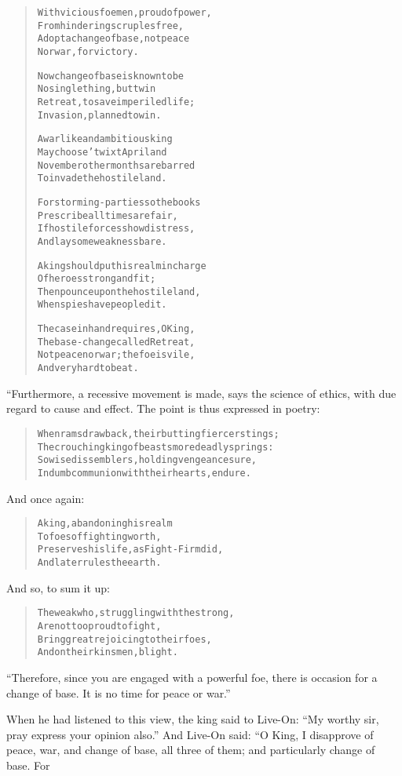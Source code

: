 \documentclass[article, twoside, 10pt]{memoir}
\renewenvironment{verbatim}{%
\begin{quote}%
\vskip -10pt%
\begin{alltt}\normalfont\small}{\end{alltt}%
\end{quote}%
\vskip -10pt
} %
\begin{document}
\begin{verbatim}
With vicious foemen, proud of power,
    From hindering scruples free,
Adopt a change of base, not peace
    Nor war, for victory.

Now change of base is known to be
    No single thing, but twin{\textemdash}
Retreat, to save imperiled life;
    Invasion, planned to win.

A warlike and ambitious king
    May choose 'twixt April and
November{\textemdash}other months are barred{\textemdash}
    To invade the hostile land.

For storming-parties{\textemdash}so the books
    Prescribe{\textemdash}all times are fair,
If hostile forces show distress,
    And lay some weakness bare.

A king should put his realm in charge
    Of heroes strong and fit;
Then pounce upon the hostile land,
    When spies have peopled it.

The case in hand requires, O King,
    The base-change called Retreat,
Not peace nor war; the foe is vile,
    And very hard to beat.
\end{verbatim}
“Furthermore, a recessive movement is made, says the science of
ethics, with due regard to cause and effect. The point is thus
expressed in poetry:

\begin{verbatim}
When rams draw back, their butting fiercer stings;
The crouching king of beasts more deadly springs:
So wise dissemblers, holding vengeance sure,
In dumb communion with their hearts, endure.
\end{verbatim}
And once again:

\begin{verbatim}
A king, abandoning his realm
    To foes of fighting worth,
Preserves his life, as Fight-Firm did,
    And later rules the earth.
\end{verbatim}
And so, to sum it up:

\begin{verbatim}
The weak who, struggling with the strong,
    Are not too proud to fight,
Bring great rejoicing to their foes,
    And on their kinsmen, blight.
\end{verbatim}
``Therefore, since you are engaged with a powerful foe, there is occasion for a change of base. It is no time for peace or war.''

When he had listened to this view, the king said to Live-On:
``My worthy sir, pray express your opinion also.'' And Live-On
said: “O King, I disapprove of peace, war, and change of base, all
three of them; and particularly change of base. For
\end{document}
